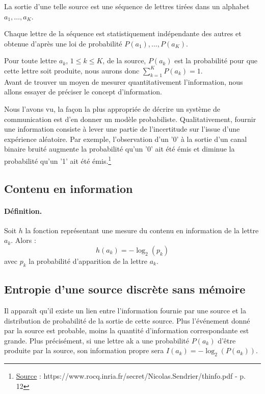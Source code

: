 \documentclass{article}
\newcommand{\plagiat}[1]{\footnote{\underline{Source} : https://www.rocq.inria.fr/secret/Nicolas.Sendrier/thinfo.pdf - p. #1}}
\begin{document}
    {La sortie d'une telle source est une séquence de lettres tirées dans un alphabet ${a_1, \ldots, a_K}$.
    
    Chaque lettre de la séquence est statistiquement indépendante des autres et obtenue d'après une loi de probabilité $P(a_1), \ldots, P(a_K)$.
    
    Pour toute lettre $a_k$, $1 \le k \le K$, de la source, $P(a_k)$ est la probabilité pour que cette lettre soit produite, nous aurons donc $\sum^K_{k=1} P(a_k) = 1$.\\

    Avant de trouver un moyen de mesurer quantitativement l'information, nous allons essayer de préciser le concept d'information.

    Nous l'avons vu, la façon la plus appropriée de décrire un système de communication est d'en donner un modèle probabiliste. Qualitativement, fournir une information consiste à lever une partie de l'incertitude sur l'issue d'une expérience aléatoire. Par exemple, l'observation d'un '0' à la sortie d'un canal binaire bruité augmente la probabilité qu'un '0' ait été émis et diminue la probabilité qu'un '1' ait été émis.\plagiat{12}

    \subsection{Contenu en information}

    \paragraph{Définition.}  

    Soit $h$ la fonction représentant une mesure du contenu en information de la lettre $a_k$. Alors :
    \[h(a_k) = -\log_{2}(p_k)\]
    avec $p_k$ la probabilité d'apparition de la lettre $a_k$.

    \subsection{Entropie d'une source discrète sans mémoire}

    Il apparaît qu'il existe un lien entre l'information fournie par une source et la distribution de probabilité de la sortie de cette source. Plus l'événement donné par la source est probable, moins la quantité d'information correspondante est grande. Plus précisément, si une lettre ak a une probabilité $P(a_k)$ d'être produite par la source, son information propre sera $I(a_k) = -\log_2(P(a_k))$.\\

}
\end{document}
